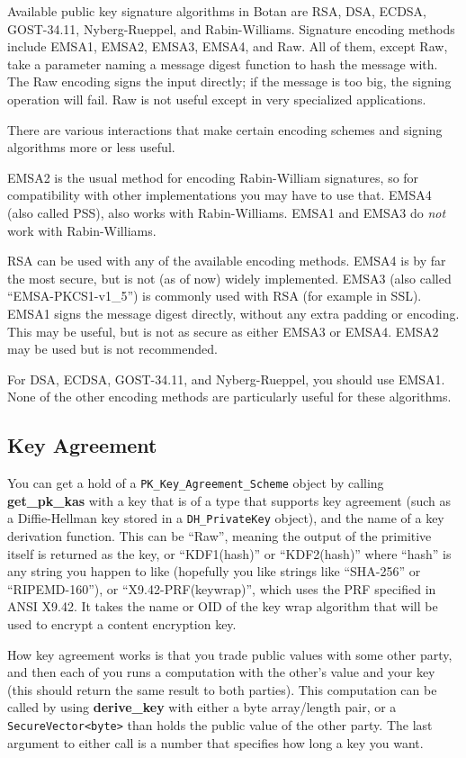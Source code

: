\documentclass{article}
\newcommand{\function}[1]{\textbf{#1}}
\newcommand{\type}[1]{\texttt{#1}}
\begin{document}
Available public key signature algorithms in Botan are RSA, DSA,
ECDSA, GOST-34.11, Nyberg-Rueppel, and Rabin-Williams. Signature
encoding methods include EMSA1, EMSA2, EMSA3, EMSA4, and Raw. All of
them, except Raw, take a parameter naming a message digest function to
hash the message with. The Raw encoding signs the input directly; if
the message is too big, the signing operation will fail. Raw is not
useful except in very specialized applications.

There are various interactions that make certain encoding schemes and
signing algorithms more or less useful.

EMSA2 is the usual method for encoding Rabin-William signatures, so
for compatibility with other implementations you may have to use
that. EMSA4 (also called PSS), also works with Rabin-Williams. EMSA1
and EMSA3 do \emph{not} work with Rabin-Williams.

RSA can be used with any of the available encoding methods. EMSA4 is
by far the most secure, but is not (as of now) widely
implemented. EMSA3 (also called ``EMSA-PKCS1-v1\_5'') is commonly used
with RSA (for example in SSL). EMSA1 signs the message digest
directly, without any extra padding or encoding. This may be useful,
but is not as secure as either EMSA3 or EMSA4. EMSA2 may be used but
is not recommended.

For DSA, ECDSA, GOST-34.11, and Nyberg-Rueppel, you should use
EMSA1. None of the other encoding methods are particularly useful for
these algorithms.

\subsection{Key Agreement}

You can get a hold of a \type{PK\_Key\_Agreement\_Scheme} object by
calling \function{get\_pk\_kas} with a key that is of a type that
supports key agreement (such as a Diffie-Hellman key stored in a
\type{DH\_PrivateKey} object), and the name of a key derivation
function. This can be ``Raw'', meaning the output of the primitive
itself is returned as the key, or ``KDF1(hash)'' or ``KDF2(hash)''
where ``hash'' is any string you happen to like (hopefully you like
strings like ``SHA-256'' or ``RIPEMD-160''), or
``X9.42-PRF(keywrap)'', which uses the PRF specified in ANSI X9.42. It
takes the name or OID of the key wrap algorithm that will be used to
encrypt a content encryption key.

How key agreement works is that you trade public values with some
other party, and then each of you runs a computation with the other's
value and your key (this should return the same result to both
parties). This computation can be called by using
\function{derive\_key} with either a byte array/length pair, or a
\type{SecureVector<byte>} than holds the public value of the other
party. The last argument to either call is a number that specifies how
long a key you want.
\end{document}

